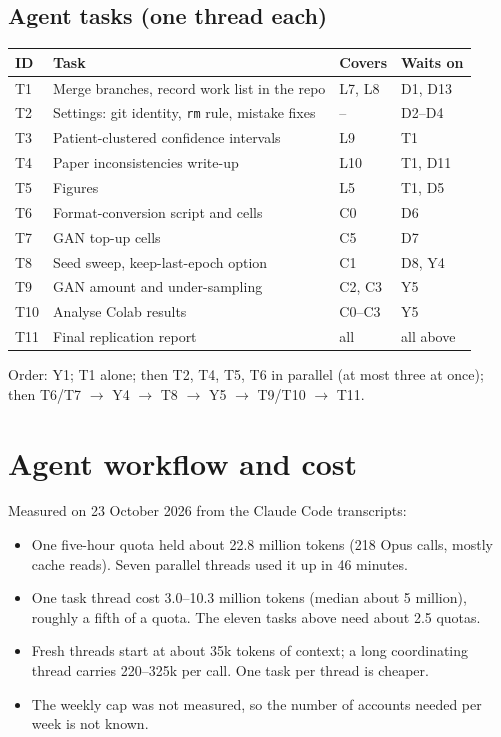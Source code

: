 \documentclass[10pt,a4paper]{article}
\begin{document}
\subsection{Agent tasks (one thread each)}
\noindent
\begin{tabularx}{\linewidth}{@{}l Y l l@{}}
\toprule
ID & Task & Covers & Waits on \\
\midrule
T1 & Merge branches, record work list in the repo & L7, L8 & D1, D13 \\
T2 & Settings: git identity, \texttt{rm} rule, mistake fixes & -- & D2--D4 \\
T3 & Patient-clustered confidence intervals & L9 & T1 \\
T4 & Paper inconsistencies write-up & L10 & T1, D11 \\
T5 & Figures & L5 & T1, D5 \\
T6 & Format-conversion script and cells & C0 & D6 \\
T7 & GAN top-up cells & C5 & D7 \\
T8 & Seed sweep, keep-last-epoch option & C1 & D8, Y4 \\
T9 & GAN amount and under-sampling & C2, C3 & Y5 \\
T10 & Analyse Colab results & C0--C3 & Y5 \\
T11 & Final replication report & all & all above \\
\bottomrule
\end{tabularx}

\medskip
\noindent
Order: Y1; T1 alone; then T2, T4, T5, T6 in parallel (at most three at once); then
T6/T7 $\to$ Y4 $\to$ T8 $\to$ Y5 $\to$ T9/T10 $\to$ T11.

\section{Agent workflow and cost}

Measured on 23 October 2026 from the Claude Code transcripts:
\begin{itemize}
  \item One five-hour quota held about 22.8 million tokens (218 Opus calls, mostly cache
        reads). Seven parallel threads used it up in 46 minutes.
  \item One task thread cost 3.0--10.3 million tokens (median about 5 million), roughly a
        fifth of a quota. The eleven tasks above need about 2.5 quotas.
  \item Fresh threads start at about 35k tokens of context; a long coordinating thread
        carries 220--325k per call. One task per thread is cheaper.
  \item The weekly cap was not measured, so the number of accounts needed per week is not
        known.
\end{itemize}
\end{document}
